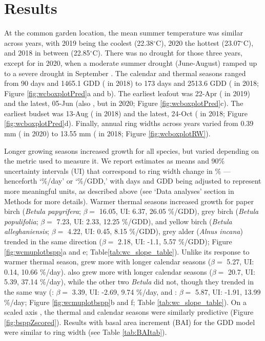 \section{Results}
At the common garden location, the mean summer temperature was similar across years, with 2019 being the coolest 
(22.38$^\circ$C), 2020 the hottest 
(23.07$^\circ$C), and 2018 in between 
(22.85$^\circ$C). There was no drought for those three years, except for in 2020, when a moderate summer drought (June-August) ramped up to a severe drought in September \citep{nationalcentersforenvironmentalinformationncei_north_2026}.
The calendar and thermal seasons ranged from 
90 days and 
1465.1 GDD ({\Ball} in 2018) to 
173 days and 2513.6 GDD ({\Ainc} in 2018; Figure \ref{fig:wcboxplotPred}a and b). 
The earliest leafout was
22-Apr ({\Ainc} in
2019) and the latest,
05-Jun (also {\Ainc}, but in
2020; Figure \ref{fig:wcboxplotPred}c). The earliest budset was 
13-Aug ({\Ball} in
2018) and the latest, 
24-Oct ({\Ainc} in
2018; Figure \ref{fig:wcboxplotPred}d). Finally, annual ring widths across years varied from 
0.39 mm ({\Ball} in 2020) to 
13.55 mm ({\Bpop} in 2018; Figure \ref{fig:wcboxplotRW}).  


Longer growing seasons increased growth for all species, but varied depending on the metric used to measure it. We report estimates as means and 90\% uncertainty intervals (UI) that correspond to ring width change in \% ---henceforth `\%/day'  or `\%/GDD,' with days and GDD being adjusted to represent more meaningful units, as described above (see `Data analyses' section in Methods for more details).
Warmer thermal seasons increased growth for paper birch (\textit{Betula papyrifera}; $\beta =$
16.05, UI:
6.37, 
26.05 \%/GDD), grey birch (\textit{Betula populifolia}; $\beta =$
7.23, UI: 
2.33, 
12.25 \%/GDD), and yellow birch (\textit{Betula alleghaniensis}; $\beta =$
4.22, UI: 
0.45, 
8.15 \%/GDD), grey alder (\textit{Alnus incana}) trended in the same direction ($\beta =$ 
2.18, UI: 
-1.1, 
5.57 \%/GDD); Figure \ref{fig:wcmuplotbspp}a and e; Table\ref{tab:wc_slope_table}).
Unlike its response to warmer thermal season, {\Ainc} grew more with longer calendar seasons ($\beta =$
5.27, UI: 
0.14,
10.66 \%/day). {\Bpap} also grew more with longer calendar seasons
($\beta =$ 20.7, UI: 
5.39, 
37.14 \%/day), while the other two \textit{Betula} did not, though they trended in the same way ({\Ball}: $\beta =$
3.39, UI: 
-2.69, 
9.74 \%/day, and {\Bpop}: $\beta =$
5.87, UI: 
-1.91, 
13.99 \%/day; Figure \ref{fig:wcmuplotbspp}b and f; Table \ref{tab:wc_slope_table}). 
On a scaled axis \citep[through $z$-scoring,][]{gelman_data_2006}, the thermal and calendar seasons were similarly predictive (Figure \ref{fig:bsppZscored}). Results with basal area increment (BAI) for the GDD model were similar to ring width (see Table \ref{tab:BAItab}). 


